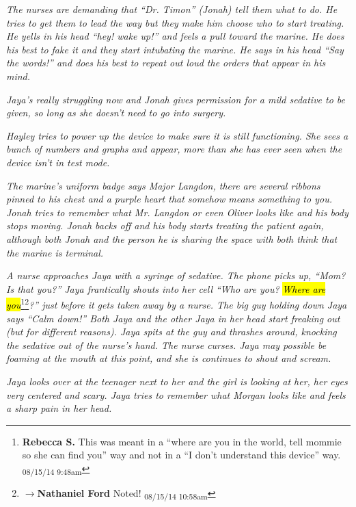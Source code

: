 \textit{The nurses are demanding that ``Dr. Timon'' (Jonah) tell them what to do.  He tries to get them to lead the way but they make him choose who to start treating.  He yells in his head ``hey!  wake up!'' and feels a pull toward the marine.  He does his best to fake it and they start intubating the marine.  He says in his head ``Say the words!'' and does his best to repeat out loud the orders that appear in his mind.}



\textit{Jaya's really struggling now and Jonah gives permission for a mild sedative to be given, so long as she doesn't need to go into surgery.}



\textit{Hayley tries to power up the device to make sure it is still functioning.  She sees a bunch of numbers and graphs and appear, more than she has ever seen when the device isn't in test mode.}



\textit{The marine's uniform badge says Major Langdon, there are several ribbons pinned to his chest and a purple heart that somehow means something to you.  Jonah tries to remember what Mr. Langdon or even Oliver looks like and his body stops moving.  Jonah backs off and his body starts treating the patient again, although both Jonah and the person he is sharing the space with both think that the marine is terminal.}



\textit{A nurse approaches Jaya with a syringe of sedative.  The phone picks up, ``Mom? Is that you?''  Jaya frantically shouts into her cell ``Who are you? }\textit{\hl{Where are you}}\footnote{\textbf{Rebecca S. }This was meant in a ``where are you in the world, tell mommie so she can find you'' way and not in a ``I don't understand this device'' way. \textsubscript{08/15/14 9:48am}}\footnote{$\rightarrow$\textbf{Nathaniel Ford }Noted! \textsubscript{08/15/14 10:58am}}\textit{?'' just before it gets taken away by a nurse.  The big guy holding down Jaya says ``Calm down!''  Both Jaya and the other Jaya in her head start freaking out (but for different reasons).  Jaya spits at the guy and thrashes around, knocking the sedative out of the nurse's hand.  The nurse curses.  Jaya may possible be foaming at the mouth at this point, and she is continues to shout and scream. }



\textit{Jaya looks over at the teenager next to her and the girl is looking at her, her eyes very centered and scary.  Jaya tries to remember what Morgan looks like and feels a sharp pain in her head.  }



